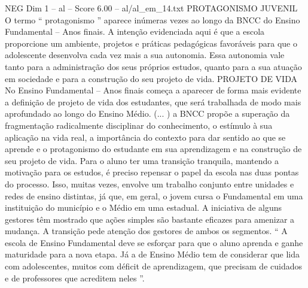 \begin{textsample}{NEG Dim 1 – al – Score 6.00 – al/al\_em\_14.txt}  \label{ex:f1_neg_139}
PROTAGONISMO JUVENIL O termo “ protagonismo ” aparece inúmeras vezes ao longo da BNCC do Ensino Fundamental – Anos finais.
A intenção evidenciada aqui é que a escola proporcione um ambiente, projetos e práticas pedagógicas favoráveis para que o adolescente desenvolva cada vez mais a sua autonomia.
Essa autonomia vale tanto para a administração dos seus próprios estudos, quanto para a sua atuação em sociedade e para a construção do seu projeto de vida.
PROJETO DE VIDA No Ensino Fundamental – Anos finais começa a aparecer de forma mais evidente a definição de projeto de vida dos estudantes, que será trabalhada de modo mais aprofundado ao longo do Ensino Médio. (... ) a BNCC propõe a superação da fragmentação radicalmente disciplinar do conhecimento, o estímulo à sua aplicação na vida real, a importância do contexto para dar sentido ao que se aprende e o protagonismo do estudante em sua aprendizagem e na construção de seu projeto de vida.
Para o aluno ter uma transição tranquila, mantendo a motivação para os estudos, é preciso repensar o papel da escola nas duas pontas do processo.
Isso, muitas vezes, envolve um trabalho conjunto entre unidades e redes de ensino distintas, já que, em geral, o jovem cursa o Fundamental em uma instituição do município e o Médio em uma estadual.
A iniciativa de alguns gestores têm mostrado que ações simples são bastante eficazes para amenizar a mudança.
A transição pede atenção dos gestores de ambos os segmentos. “ A escola de Ensino Fundamental deve se esforçar para que o aluno aprenda e ganhe maturidade para a nova etapa.
Já a de Ensino Médio tem de considerar que lida com adolescentes, muitos com déficit de aprendizagem, que precisam de cuidados e de professores que acreditem neles ”.

\end{textsample}
